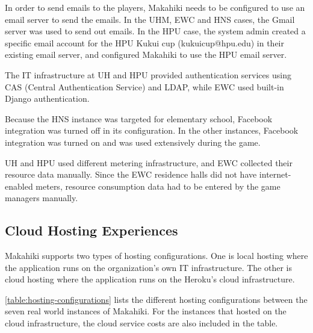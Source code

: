 In order to send emails to the players, Makahiki needs to be configured to use an email server to send the emails. In the UHM, EWC and HNS cases, the Gmail server was used to send out emails. In the HPU case, the system admin created a specific email account for the HPU Kukui cup (kukuicup@hpu.edu) in their existing email server, and configured Makahiki to use the HPU email server. 

The IT infrastructure at UH and HPU provided authentication services using CAS (Central Authentication Service) and LDAP, while EWC used built-in Django authentication.  

Because the HNS instance was targeted for elementary school, Facebook integration was turned off in its configuration. In the other instances, Facebook integration was turned on and was used extensively during the game.

UH and HPU used different metering infrastructure, and EWC collected their resource data manually.  Since the EWC
residence halls did not have internet-enabled meters, resource consumption data had to be entered by
the game managers manually.

\subsection{Cloud Hosting Experiences}
\label{section:cloud-hosting}

Makahiki supports two types of hosting configurations. One is local hosting where the application runs on the organization's own IT infrastructure. The other is cloud hosting where the application runs on the Heroku's cloud infrastructure.

\autoref{table:hosting-configurations} lists the different hosting configurations between the seven real world instances of Makahiki. For the instances that hosted on the cloud infrastructure, the cloud service costs are also included in the table.  

